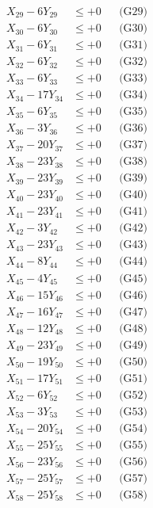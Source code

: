 \documentclass[a4paper,10pt]{article}
\begin{document}
{\begin{align}
X_{29} - 6Y_{29} &\leq +0 && \text{(G29)} \\
X_{30} - 6Y_{30} &\leq +0 && \text{(G30)} \\
X_{31} - 6Y_{31} &\leq +0 && \text{(G31)} \\
X_{32} - 6Y_{32} &\leq +0 && \text{(G32)} \\
X_{33} - 6Y_{33} &\leq +0 && \text{(G33)} \\
X_{34} - 17Y_{34} &\leq +0 && \text{(G34)} \\
X_{35} - 6Y_{35} &\leq +0 && \text{(G35)} \\
\allowbreak
X_{36} - 3Y_{36} &\leq +0 && \text{(G36)} \\
X_{37} - 20Y_{37} &\leq +0 && \text{(G37)} \\
X_{38} - 23Y_{38} &\leq +0 && \text{(G38)} \\
X_{39} - 23Y_{39} &\leq +0 && \text{(G39)} \\
X_{40} - 23Y_{40} &\leq +0 && \text{(G40)} \\
X_{41} - 23Y_{41} &\leq +0 && \text{(G41)} \\
X_{42} - 3Y_{42} &\leq +0 && \text{(G42)} \\
X_{43} - 23Y_{43} &\leq +0 && \text{(G43)} \\
X_{44} - 8Y_{44} &\leq +0 && \text{(G44)} \\
X_{45} - 4Y_{45} &\leq +0 && \text{(G45)} \\
\allowbreak
X_{46} - 15Y_{46} &\leq +0 && \text{(G46)} \\
X_{47} - 16Y_{47} &\leq +0 && \text{(G47)} \\
X_{48} - 12Y_{48} &\leq +0 && \text{(G48)} \\
X_{49} - 23Y_{49} &\leq +0 && \text{(G49)} \\
X_{50} - 19Y_{50} &\leq +0 && \text{(G50)} \\
X_{51} - 17Y_{51} &\leq +0 && \text{(G51)} \\
X_{52} - 6Y_{52} &\leq +0 && \text{(G52)} \\
X_{53} - 3Y_{53} &\leq +0 && \text{(G53)} \\
X_{54} - 20Y_{54} &\leq +0 && \text{(G54)} \\
X_{55} - 25Y_{55} &\leq +0 && \text{(G55)} \\
\allowbreak
X_{56} - 23Y_{56} &\leq +0 && \text{(G56)} \\
X_{57} - 25Y_{57} &\leq +0 && \text{(G57)} \\
X_{58} - 25Y_{58} &\leq +0 && \text{(G58)} \\

\end{align}}
\end{document}
